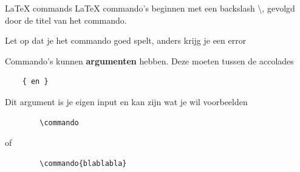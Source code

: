 \copyrightTim

\begin{frame}[fragile]{LaTeX commands}
    LaTeX commando's beginnen met een backslash \textbackslash, gevolgd door de titel van het commando.
    \pause

    Let op dat je het commando goed spelt, anders krijg je een error

    \pause
    Commando's kunnen \textbf{argumenten} hebben. Deze moeten tussen de accolades 
    \begin{verbatim} 
    { en } 
    \end{verbatim}
    \pause
    Dit argument is je eigen input en kan zijn wat je wil
    \pause
    voorbeelden

    \begin{verbatim}
        \commando
    \end{verbatim}
    of
    \begin{verbatim}
        \commando{blablabla}
    \end{verbatim}

\end{frame}